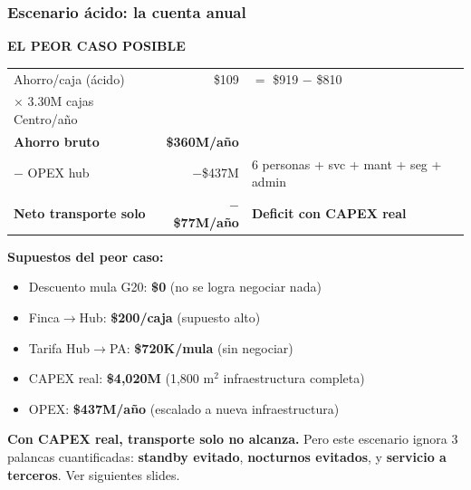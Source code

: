 \documentclass[aspectratio=169, 10pt]{beamer}
\newcommand{\tagline}[2]{{\scriptsize\color{#1}\textbf{\MakeUppercase{#2}}}}
\begin{document}
\begin{frame}
\frametitle{Escenario \'acido: la cuenta anual}
\tagline{amarillo}{El Peor Caso Posible}
\vspace{-2pt}

\begin{center}
\scriptsize
\renewcommand{\arraystretch}{1.15}
\begin{tabular}{l r l}
    \toprule
    Ahorro/caja (\'acido) & \$109 & $=$ \$919 $-$ \$810 \\
    $\times$ 3.30M cajas Centro/a\~no & & \\
    \midrule
    \textbf{Ahorro bruto} & \textbf{\$360M/a\~no} & \\
    $-$ OPEX hub & $-$\$437M & {\tiny 6 personas + svc + mant + seg + admin} \\
    \midrule
    \textcolor{rojo}{\textbf{Neto transporte solo}} & \textcolor{rojo}{\textbf{$-$\$77M/a\~no}} & \textcolor{rojo}{\textbf{Deficit con CAPEX real}} \\
    \bottomrule
\end{tabular}
\end{center}

\vspace{6pt}
\colorbox{amarilloclaro}{\parbox{\dimexpr\textwidth-12pt}{\scriptsize\strut
\textcolor{amarillo}{\textbf{Supuestos del peor caso:}}
\begin{itemize}\setlength\itemsep{-2pt}\scriptsize
    \item[\textcolor{amarillo}{\tiny$\blacksquare$}] Descuento mula G20: \textbf{\$0} (no se logra negociar nada)
    \item[\textcolor{amarillo}{\tiny$\blacksquare$}] Finca$\rightarrow$Hub: \textbf{\$200/caja} (supuesto alto)
    \item[\textcolor{amarillo}{\tiny$\blacksquare$}] Tarifa Hub$\rightarrow$PA: \textbf{\$720K/mula} (sin negociar)
    \item[\textcolor{amarillo}{\tiny$\blacksquare$}] CAPEX real: \textbf{\$4,020M} (1,800 m$^2$ infraestructura completa)
    \item[\textcolor{amarillo}{\tiny$\blacksquare$}] OPEX: \textbf{\$437M/a\~no} (escalado a nueva infraestructura)
\end{itemize}
\strut}}

\vspace{2pt}
\colorbox{rojoclaro}{\parbox{\dimexpr\textwidth-12pt}{\scriptsize\strut
\textcolor{rojo}{\textbf{Con CAPEX real, transporte solo no alcanza.}}
Pero este escenario ignora 3 palancas cuantificadas:
\textcolor{cian}{\textbf{standby evitado}}, \textcolor{cian}{\textbf{nocturnos evitados}}, y
\textcolor{verde}{\textbf{servicio a terceros}}. Ver siguientes slides.\strut}}
\end{frame}
\end{document}
